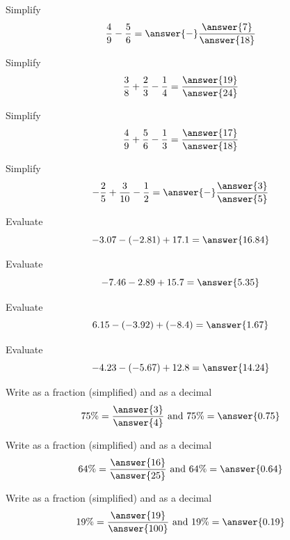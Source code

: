 \documentclass{ximera}
\begin{document}
\begin{problem}
Simplify
\[
\frac{4}{9} - \frac{5}{6} = \answer{-} \frac{\answer{7}}{\answer{18}}
\]
\end{problem}

\begin{problem}
Simplify
\[
\frac{3}{8}+ \frac{2}{3} - \frac{1}{4} = \frac{\answer{19}}{\answer{24}}
\]
\end{problem}

\begin{problem}
Simplify
\[
\frac{4}{9} + \frac{5}{6} - \frac{1}{3} = \frac{\answer{17}}{\answer{18}}
\]
\end{problem}

\begin{problem}
Simplify
\[
-\frac{2}{5} + \frac{3}{10} - \frac{1}{2} = \answer{-} \frac{\answer{3}}{\answer{5}}
\]
\end{problem}

\begin{problem}
   Evaluate
\[
-3.07 - (-2.81) + 17.1 = \answer{16.84}
\]
\end{problem}

\begin{problem}
   Evaluate
\[
-7.46 - 2.89 + 15.7 = \answer{5.35}
\]
\end{problem}

\begin{problem} Evaluate
\[
6.15 - (-3.92) + (-8.4) = \answer{1.67}
\]
\end{problem}

\begin{problem} Evaluate 
\[
-4.23 - (-5.67) + 12.8 = \answer{14.24}
\]
\end{problem}

\begin{problem}
Write as a fraction (simplified) and as a decimal
\[
75\% = \frac{\answer{3}}{\answer{4}} \text{ and } 75\% = \answer{0.75}
\]
\end{problem}

\begin{problem}
Write as a fraction (simplified) and as a decimal
\[
64\% = \frac{\answer{16}}{\answer{25}} \text{ and } 64\% = \answer{0.64}
\]
\end{problem}

\begin{problem}
Write as a fraction (simplified) and as a decimal
\[
19\% = \frac{\answer{19}}{\answer{100}} \text{ and } 19\% = \answer{0.19}
\]
\end{problem}
\end{document}
